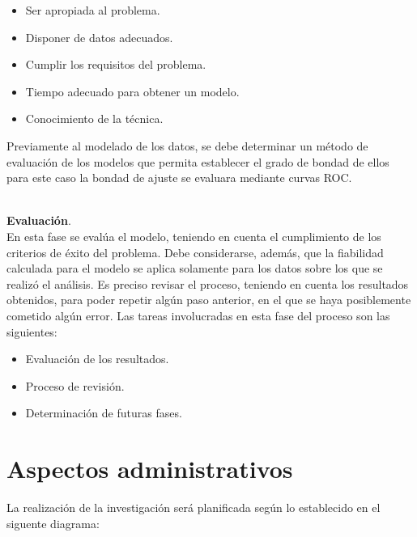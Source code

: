 \begin{itemize}
\item	Ser apropiada al problema. 
\item	Disponer de datos adecuados. 
\item	Cumplir los requisitos del problema. 
\item	Tiempo adecuado para obtener un modelo. 
\item	Conocimiento de la técnica.
\end{itemize}

Previamente al modelado de los datos, se debe determinar un método de evaluación de los modelos que permita establecer el grado de bondad de ellos para este caso la bondad de ajuste se evaluara mediante curvas ROC.\\\

\noindent
\textbf{Evaluación}.\\

	En esta fase se evalúa el modelo, teniendo en cuenta el cumplimiento de los criterios de éxito del problema. Debe considerarse, además, que la fiabilidad calculada para el modelo se aplica solamente para los datos sobre los que se realizó el análisis. Es preciso revisar el proceso, teniendo en cuenta los resultados obtenidos, para poder repetir algún paso anterior, en el que se haya posiblemente cometido algún error. Las tareas involucradas en esta fase del proceso son las siguientes:\\

\begin{itemize}
\item	Evaluación de los resultados.
\item	Proceso de revisión.
\item	Determinación de futuras fases.
\end{itemize}

\section{Aspectos administrativos}

\vspace{1 cm}
La realización de la investigación será planificada según lo establecido en el siguente diagrama:\\

